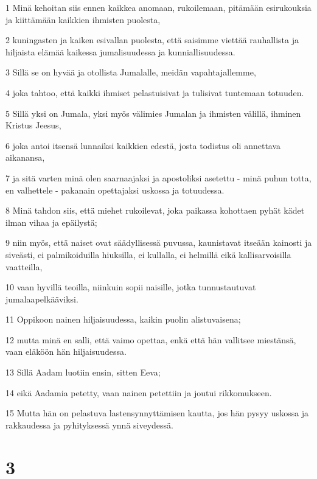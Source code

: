 \par 1 Minä kehoitan siis ennen kaikkea anomaan, rukoilemaan, pitämään esirukouksia ja kiittämään kaikkien ihmisten puolesta,
\par 2 kuningasten ja kaiken esivallan puolesta, että saisimme viettää rauhallista ja hiljaista elämää kaikessa jumalisuudessa ja kunniallisuudessa.
\par 3 Sillä se on hyvää ja otollista Jumalalle, meidän vapahtajallemme,
\par 4 joka tahtoo, että kaikki ihmiset pelastuisivat ja tulisivat tuntemaan totuuden.
\par 5 Sillä yksi on Jumala, yksi myös välimies Jumalan ja ihmisten välillä, ihminen Kristus Jeesus,
\par 6 joka antoi itsensä lunnaiksi kaikkien edestä, josta todistus oli annettava aikanansa,
\par 7 ja sitä varten minä olen saarnaajaksi ja apostoliksi asetettu - minä puhun totta, en valhettele - pakanain opettajaksi uskossa ja totuudessa.
\par 8 Minä tahdon siis, että miehet rukoilevat, joka paikassa kohottaen pyhät kädet ilman vihaa ja epäilystä;
\par 9 niin myös, että naiset ovat säädyllisessä puvussa, kaunistavat itseään kainosti ja siveästi, ei palmikoiduilla hiuksilla, ei kullalla, ei helmillä eikä kallisarvoisilla vaatteilla,
\par 10 vaan hyvillä teoilla, niinkuin sopii naisille, jotka tunnustautuvat jumalaapelkääviksi.
\par 11 Oppikoon nainen hiljaisuudessa, kaikin puolin alistuvaisena;
\par 12 mutta minä en salli, että vaimo opettaa, enkä että hän vallitsee miestänsä, vaan eläköön hän hiljaisuudessa.
\par 13 Sillä Aadam luotiin ensin, sitten Eeva;
\par 14 eikä Aadamia petetty, vaan nainen petettiin ja joutui rikkomukseen.
\par 15 Mutta hän on pelastuva lastensynnyttämisen kautta, jos hän pysyy uskossa ja rakkaudessa ja pyhityksessä ynnä siveydessä.

\chapter{3}

